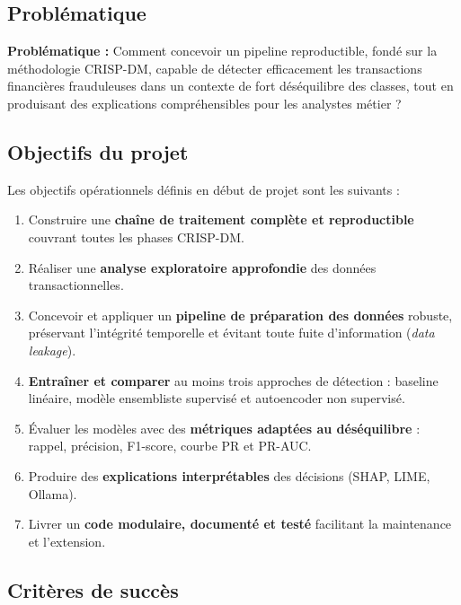 \documentclass[12pt,a4paper,twoside]{report}
\begin{document}
\subsection{Problématique}

\begin{definitionbox}
\textbf{Problématique :} Comment concevoir un pipeline reproductible, fondé sur la méthodologie CRISP-DM, capable de détecter efficacement les transactions financières frauduleuses dans un contexte de fort déséquilibre des classes, tout en produisant des explications compréhensibles pour les analystes métier ?
\end{definitionbox}

\subsection{Objectifs du projet}

Les objectifs opérationnels définis en début de projet sont les suivants :

\begin{enumerate}
  \item Construire une \textbf{chaîne de traitement complète et reproductible} couvrant toutes les phases CRISP-DM.
  \item Réaliser une \textbf{analyse exploratoire approfondie} des données transactionnelles.
  \item Concevoir et appliquer un \textbf{pipeline de préparation des données} robuste, préservant l'intégrité temporelle et évitant toute fuite d'information (\textit{data leakage}).
  \item \textbf{Entraîner et comparer} au moins trois approches de détection : baseline linéaire, modèle ensembliste supervisé et autoencoder non supervisé.
  \item Évaluer les modèles avec des \textbf{métriques adaptées au déséquilibre} : rappel, précision, F1-score, courbe PR et PR-AUC.
  \item Produire des \textbf{explications interprétables} des décisions (SHAP, LIME, Ollama).
  \item Livrer un \textbf{code modulaire, documenté et testé} facilitant la maintenance et l'extension.
\end{enumerate}

\subsection{Critères de succès}
\end{document}
